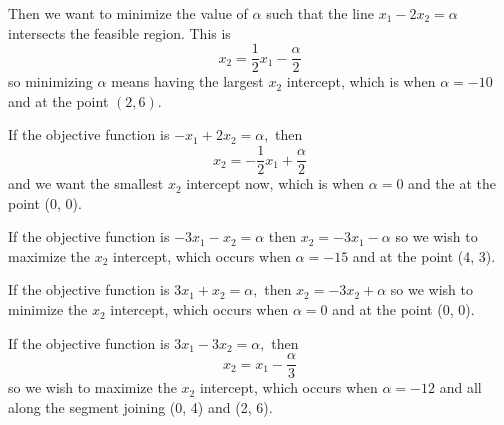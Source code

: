 \documentclass{article}
\begin{document}
\begin{enumerate}
\begin{soln}
\begin{center}
\begin{asy}
				\end{asy}
			\end{center}
			Then we want to minimize the value of $\alpha$ such that the line $x_1-2x_2=\alpha$ intersects the feasible region. This is \[x_2=\frac{1}{2}x_1-\frac{\alpha}{2}\] so minimizing $\alpha$ means having the largest $x_2$ intercept, which is when $\alpha=-10$ and at the point $(2, 6).$

			If the objective function is $-x_1+2x_2=\alpha,$ then \[x_2=-\frac{1}{2}x_1+\frac{\alpha}{2}\] and we want the smallest $x_2$ intercept now, which is when $\alpha=0$ and the at the point (0, 0).

			If the objective function is $-3x_1-x_2=\alpha$ then $x_2=-3x_1-\alpha$ so we wish to maximize the $x_2$ intercept, which occurs when $\alpha=-15$ and at the point (4, 3).

			If the objective function is $3x_1+x_2=\alpha,$ then $x_2=-3x_2+\alpha$ so we wish to minimize the $x_2$ intercept, which occurs when $\alpha=0$ and at the point (0, 0).

			If the objective function is $3x_1-3x_2=\alpha,$ then \[x_2=x_1-\frac{\alpha}{3}\] so we wish to maximize the $x_2$ intercept, which occurs when $\alpha=-12$ and all along the segment joining (0, 4) and (2, 6).

		\end{soln}


\end{enumerate}
\end{document}
